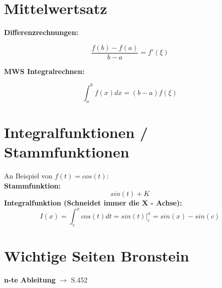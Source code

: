 \documentclass{article}
\begin{document}
\section{Mittelwertsatz}
\begin{multicols}{2}
\textbf{Differenzrechnungen:}
\begin{center}
    \begin{equation*}
    \frac{f(b) - f(a)}{b-a} = f'(\xi)
    \end{equation*}
\end{center}
\columnbreak
\textbf{MWS Integralrechnen:}
\begin{center}
    \begin{equation*}
    \int_{a}^{b}f(x)dx = (b - a)f(\xi) 
    \end{equation*}
\end{center}
\end{multicols}
\section{Integralfunktionen / Stammfunktionen}
An Beispiel von $f(t)= cos(t)$: \\
\textbf{Stammfunktion:} 
\begin{equation}
    sin(t) + K
\end{equation}
\textbf{Integralfunktion (Schneidet immer die X - Achse):}
\begin{equation*}
    I(x) = \int_{c}^{x}cos(t)dt = sin(t)|_{c}^{x} = sin(x) - sin(c)
\end{equation*}
\section{Wichtige Seiten Bronstein}
\textbf{n-te Ableitung} $\rightarrow$ S.452 


\end{document}
